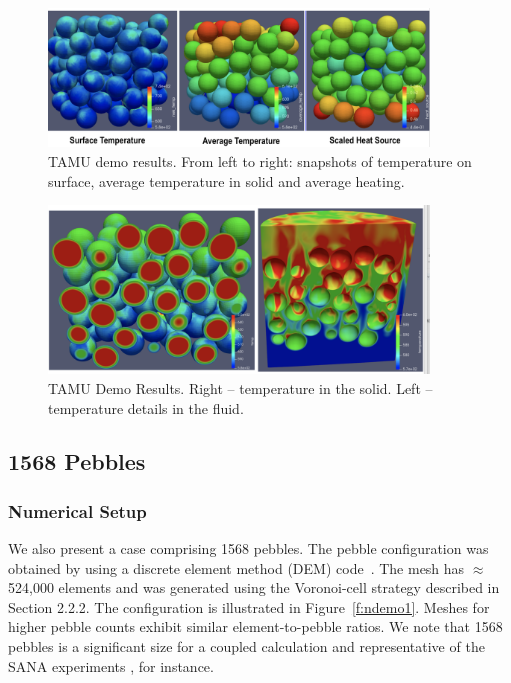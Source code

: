 \begin{figure}[!h]
\centering
\includegraphics[clip=true,width=0.9\textwidth]{Figures/demo_r1}
\caption{TAMU demo results. From left to right: snapshots of temperature on surface, average temperature in solid and average heating.}
\label{f:dtamu1}
\end{figure}

\begin{figure}[!h]
\centering
\includegraphics[clip=true,width=0.9\textwidth]{Figures/demo_r2}
\caption{TAMU Demo Results. Right -- temperature in the solid. Left -- temperature details in the fluid.}
\label{f:dtamu2}
\end{figure}

\subsection{1568 Pebbles}

\subsubsection{Numerical Setup}

We also present a case comprising 1568 pebbles. The pebble configuration was
obtained by using a discrete element method (DEM)
code~\cite{projectChronoWebSite}.  The mesh has $\approx$ 524,000 elements and
was generated using the Voronoi-cell strategy described in Section 2.2.2.
The configuration is illustrated in Figure~\ref{f:ndemo1}.
Meshes for higher pebble counts exhibit similar element-to-pebble ratios.
We note that 1568 pebbles is a significant size for a coupled calculation and
representative of the SANA experiments \cite{zou2017validation}, for instance.

